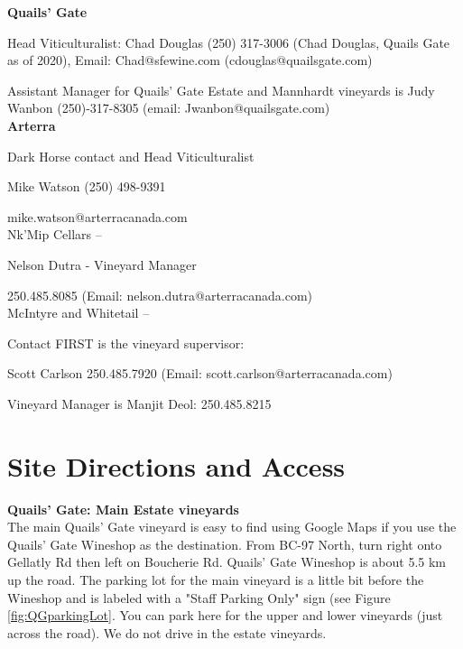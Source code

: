 \documentclass[11pt,letter]{article}
\begin{document}

{\bf Quails' Gate}

Head Viticulturalist: Chad Douglas (250) 317-3006 (Chad Douglas, Quails Gate as of 2020), Email: Chad@sfewine.com (cdouglas@quailsgate.com)

Assistant Manager for Quails' Gate Estate and Mannhardt vineyards is Judy Wanbon (250)-317-8305 (email: Jwanbon@quailsgate.com) \\

{\bf Arterra}

Dark Horse contact and Head Viticulturalist %

Mike Watson (250) 498-9391

mike.watson@arterracanada.com\\

Nk'Mip Cellars --

Nelson Dutra - Vineyard Manager

250.485.8085 (Email: nelson.dutra@arterracanada.com) \\

McIntyre and Whitetail -- 

Contact FIRST is the vineyard supervisor:

Scott Carlson 250.485.7920 (Email: scott.carlson@arterracanada.com)

Vineyard Manager is Manjit Deol: 250.485.8215


\section{Site Directions and Access}

{\bf Quails' Gate: Main Estate vineyards} \\
The main Quails' Gate vineyard is easy to find using Google Maps if you use the Quails' Gate Wineshop as the destination. 
From BC-97 North, turn right onto Gellatly Rd then left on Boucherie Rd. Quails' Gate Wineshop is about 5.5 km up the road. The parking lot for the main vineyard is a little bit before the Wineshop and is labeled with a "Staff Parking Only" sign (see Figure \ref{fig:QGparkingLot}. You can park here for the upper and lower vineyards (just across the road). We do not drive in the estate vineyards.
\end{document}

